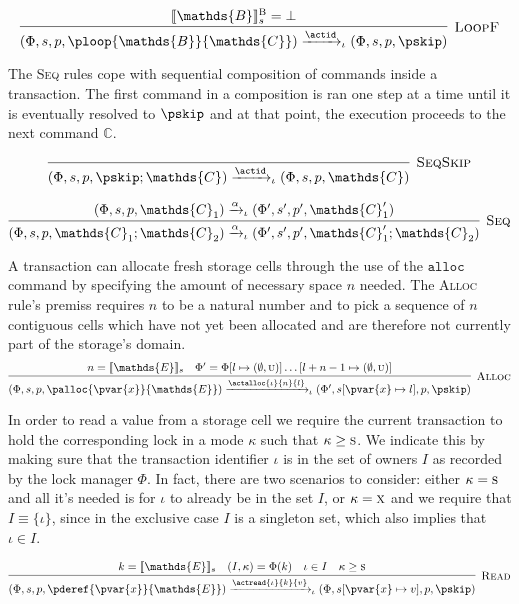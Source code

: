 \[
\infer[\textsc{LoopF}]
{
	(\Phi, s, p, \ploop{\mathds{B}}{\mathds{C}})
	\xrightarrow{\actid}_\iota
	(\Phi, s, p, \pskip)
}
{
	\llbracket \mathds{B} \rrbracket_s^\textsc{B} = \bot
}
\]

The \textsc{Seq} rules cope with sequential composition of commands inside a transaction. The first command in a composition is ran one step at a time until it is eventually resolved to $\pskip$ and at that point, the execution proceeds to the next command $\mathds{C}$.

\[
\infer[\textsc{SeqSkip}]
{
	(\Phi, s, p, \pskip ; \mathds{C})
	\xrightarrow{\actid}_\iota
	(\Phi, s, p, \mathds{C})
}
{}
\]

\[
\infer[\textsc{Seq}]
{
	(\Phi, s, p, \mathds{C}_1 ; \mathds{C}_2)
	\xrightarrow{\alpha}_\iota
	(\Phi', s', p', \mathds{C}_1' ; \mathds{C}_2)
}
{
	(\Phi, s, p, \mathds{C}_1)
	\xrightarrow{\alpha}_\iota
	(\Phi', s', p', \mathds{C}_1')
}
\]

A transaction can allocate fresh storage cells through the use of the $\mathtt{alloc}$ command by specifying the amount of necessary space $n$ needed. The \textsc{Alloc} rule's premiss requires $n$ to be a natural number and to pick a sequence of $n$ contiguous cells which have not yet been allocated and are therefore not currently part of the storage's domain.
\[
\infer[\textsc{Alloc}]
{
	(\Phi, s, p, \palloc{\pvar{x}}{\mathds{E}})
	\xrightarrow{\actalloc{\iota}{n}{l}}_\iota
	(\Phi', s[\pvar{x} \mapsto l], p, \pskip)
}
{
	n = \llbracket \mathds{E} \rrbracket_s &
	\Phi' = \Phi[l \mapsto (\emptyset, \textsc{u})]\ldots[l + n - 1 \mapsto (\emptyset, \textsc{u})]
}
\]

In order to read a value from a storage cell we require the current transaction to hold the corresponding lock in a mode $\kappa$ such that $\kappa \geq \textsc{s}$. We indicate this by making sure that the transaction identifier $\iota$ is in the set of owners $I$ as recorded by the lock manager $\Phi$. In fact, there are two scenarios to consider: either $\kappa = \textsc{s}$ and all it's needed is for $\iota$ to already be in the set $I$, or $\kappa = \textsc{x}$ and we require that $I \equiv \{ \iota \}$, since in the exclusive case $I$ is a singleton set, which also implies that $\iota \in I$.

\[
\infer[\textsc{Read}]
{
	(\Phi, s, p, \pderef{\pvar{x}}{\mathds{E}})
	\xrightarrow{\actread{\iota}{k}{v}}_\iota
	(\Phi, s[\pvar{x} \mapsto v], p, \pskip)
}
{
	k = \llbracket \mathds{E} \rrbracket_s &
	(I, \kappa) = \Phi(k) &
	\iota \in I &
	\kappa \geq \textsc{s}
}
\]

